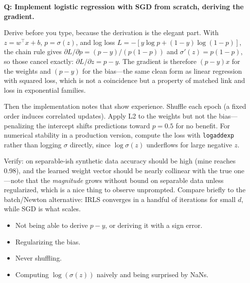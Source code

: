 \begin{interviewq}
\textbf{Q: Implement logistic regression with SGD from scratch, deriving the gradient.}

 \quad {} \quad \badgefreq{\freqhigh}

\stronganswer

Derive before you type, because the derivation is the elegant part. With $z = w^\top x + b$, $p = \sigma(z)$, and log loss $L = -[y\log p + (1-y)\log(1-p)]$, the chain rule gives $\partial L/\partial p = (p - y)/(p(1-p))$ and $\sigma'(z) = p(1-p)$, so those cancel exactly: $\partial L/\partial z = p - y$. The gradient is therefore $(p - y)x$ for the weights and $(p - y)$ for the bias---the same clean form as linear regression with squared loss, which is not a coincidence but a property of matched link and loss in exponential families.

Then the implementation notes that show experience. Shuffle each epoch (a fixed order induces correlated updates). Apply L2 to the weights but not the bias---penalizing the intercept shifts predictions toward $p = 0.5$ for no benefit. For numerical stability in a production version, compute the loss with \texttt{logaddexp} rather than logging $\sigma$ directly, since $\log \sigma(z)$ underflows for large negative $z$.

Verify: on separable-ish synthetic data accuracy should be high (mine reaches 0.98), and the learned weight vector should be nearly collinear with the true one---note that the \emph{magnitude} grows without bound on separable data unless regularized, which is a nice thing to observe unprompted. Compare briefly to the batch/Newton alternative: IRLS converges in a handful of iterations for small $d$, while SGD is what scales.

\redflags
\begin{itemize}
    \item Not being able to derive $p - y$, or deriving it with a sign error.
    \item Regularizing the bias.
    \item Never shuffling.
    \item Computing $\log(\sigma(z))$ naively and being surprised by NaNs.
\end{itemize}



\end{interviewq}
